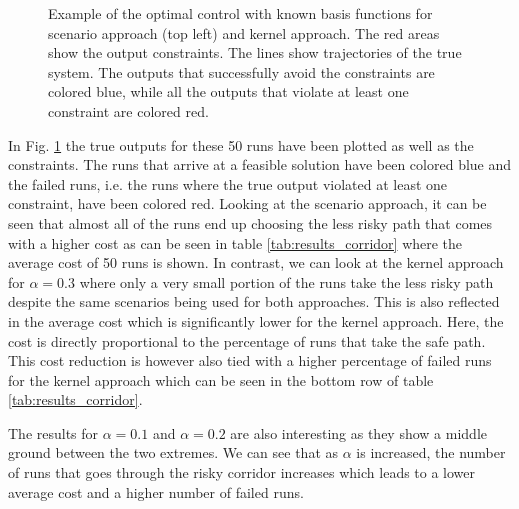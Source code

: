 \begin{figure}[htb]
{
 }
\caption{Example of the optimal control with known basis functions for scenario approach (top left) and kernel approach. The red areas show the output constraints. The lines show trajectories of the true system. The outputs that successfully avoid the constraints are colored blue, while all the outputs that violate at least one constraint are colored red.}

\label{ScenarioKernelComparisonCorridor}
\end{figure}

In Fig. \ref{ScenarioKernelComparisonCorridor} the true outputs for these 50 runs have been plotted as well as the constraints. The runs that arrive at a feasible solution have been colored blue and the failed runs, i.e. the runs where the true output violated at least one constraint, have been colored red. Looking at the scenario approach, it can be seen that almost all of the runs end up choosing the less risky path that comes with a higher cost as can be seen in table \ref{tab:results_corridor} where the average cost of 50 runs is shown.  In contrast, we can look at the kernel approach for $\alpha = 0.3$ where only a very small portion of the runs take the less risky path despite the same scenarios being used for both approaches. This is also reflected in the average cost which is significantly lower for the kernel approach. Here, the cost is directly proportional to the percentage of runs that take the safe path. This cost reduction is however also tied with a higher percentage of failed runs for the kernel approach which can be seen in the bottom row of table \ref{tab:results_corridor}.

The results for $\alpha = 0.1$ and $\alpha = 0.2$ are also interesting as they show a middle ground between the two extremes. We can see that as $\alpha$ is increased, the number of runs that goes through the risky corridor increases which leads to a lower average cost and a higher number of failed runs. 


